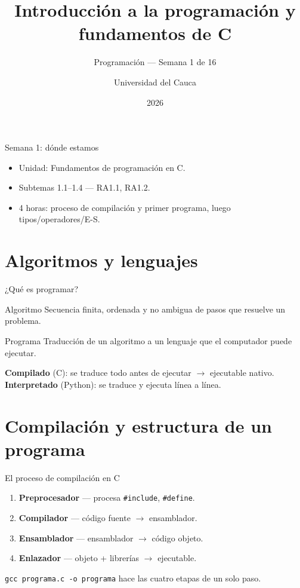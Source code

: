 \documentclass[11pt]{beamer}
\title[Semana 1: Fundamentos de C]{Introducción a la programación y fundamentos de C}
\subtitle{Programación --- Semana 1 de 16}
\author{Universidad del Cauca}
\date{2026}
\begin{document}
\begin{frame}
  \titlepage
\end{frame}

\begin{frame}{Semana 1: dónde estamos}
  \begin{itemize}
    \item Unidad: Fundamentos de programación en C.
    \item Subtemas 1.1--1.4 --- RA1.1, RA1.2.
    \item 4 horas: proceso de compilación y primer programa, luego tipos/operadores/E-S.
  \end{itemize}
  \tableofcontents
\end{frame}

\section{Algoritmos y lenguajes}

\begin{frame}{¿Qué es programar?}
  \begin{block}{Algoritmo}
    Secuencia finita, ordenada y no ambigua de pasos que resuelve un problema.
  \end{block}
  \begin{block}{Programa}
    Traducción de un algoritmo a un lenguaje que el computador puede ejecutar.
  \end{block}
  \vfill
  \textbf{Compilado} (C): se traduce todo antes de ejecutar $\to$ ejecutable nativo.\\
  \textbf{Interpretado} (Python): se traduce y ejecuta línea a línea.
\end{frame}

\section{Compilación y estructura de un programa}

\begin{frame}{El proceso de compilación en C}
  \begin{enumerate}
    \item \textbf{Preprocesador} --- procesa \texttt{\#include}, \texttt{\#define}.
    \item \textbf{Compilador} --- código fuente $\to$ ensamblador.
    \item \textbf{Ensamblador} --- ensamblador $\to$ código objeto.
    \item \textbf{Enlazador} --- objeto + librerías $\to$ ejecutable.
  \end{enumerate}
  \vfill
  \texttt{gcc programa.c -o programa} hace las cuatro etapas de un solo paso.
\end{frame}
\end{document}
